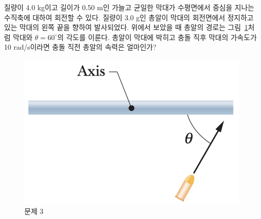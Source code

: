 \documentclass[floatfix,nofootinbib,superscriptaddress,fleqn]{revtex4-2}
\begin{document}
질량이 4.0 kg이고 길이가 0.50 m인 가늘고 균일한 막대가 수평면에서
중심을 지나는 수직축에 대하여 회전할 수 있다. 질량이 3.0 g인 총알이
막대의 회전면에서 정지하고 있는 막대의 왼쪽 끝을 향하여
발사되었다. 위에서 보았을 때 총알의 경로는 그림~\ref{fig:3}처럼 막대와
$\theta=60^\circ$의 각도를 이룬다. 총알이 막대에 박히고 충돌 직후
막대의 가속도가 10 rad/s이라면 충돌 직전 총알의 속력은 얼마인가? 
\begin{figure}[ht]
  \centering
\includegraphics[scale=0.4]{Qfig14-3-20220427.png}
  \caption{문제 3}
  \label{fig:3}
\end{figure}
\end{document}

